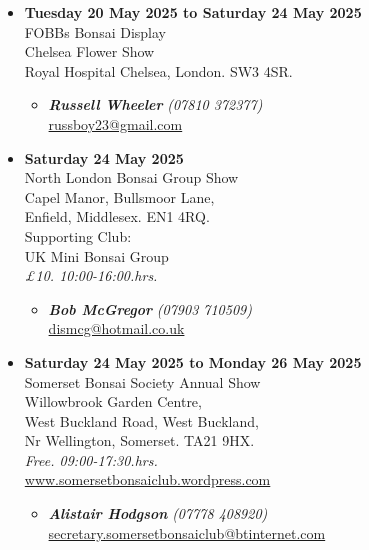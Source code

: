 \begin{itemize}
    \item \textbf{Tuesday 20 May 2025 to Saturday 24 May 2025}
    \\
    FOBBs Bonsai Display \\
    Chelsea Flower Show \\
    Royal Hospital Chelsea, London. SW3 4SR.
    \begin{itemize}
        \item \textbf{\emph{Russell Wheeler}} \emph{(07810 372377)} \\
        \href{mailto:russboy23@gmail.com}{russboy23@gmail.com} 
    \end{itemize}

    \item \textbf{Saturday 24 May 2025}
    \\
    North London Bonsai Group Show \\
    Capel Manor, Bullsmoor Lane, \\
    Enfield, Middlesex. EN1 4RQ. \\
    Supporting Club: \\
    UK Mini Bonsai Group
    \\
    \emph{£10. 10:00-16:00.hrs.}
    \begin{itemize}
        \item \textbf{\emph{Bob McGregor}} \emph{(07903 710509)} \\
        \href{mailto:dismcg@hotmail.co.uk}{dismcg@hotmail.co.uk} 
    \end{itemize}

    \item \textbf{Saturday 24 May 2025 to Monday 26 May 2025}
    \\
    Somerset Bonsai Society Annual Show \\
    Willowbrook Garden Centre, \\
    West Buckland Road, West Buckland, \\
    Nr Wellington, Somerset. TA21 9HX.
    \\
    \emph{Free. 09:00-17:30.hrs.}
    \\
    \href{http://www.somersetbonsaiclub.wordpress.com/}{www.somersetbonsaiclub.wordpress.com}
    \begin{itemize}
        \item \textbf{\emph{Alistair Hodgson}} \emph{(07778 408920)} \\
        \href{mailto:secretary.somersetbonsaiclub@btinternet.com}{secretary.somersetbonsaiclub@btinternet.com} 
    \end{itemize}


\end{itemize}

